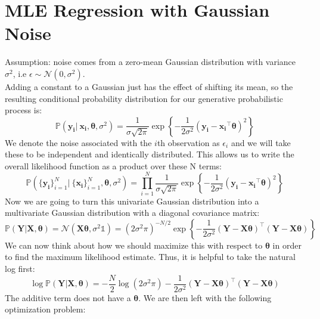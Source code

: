 \documentclass[twoside]{article}
\begin{document}
\section{MLE Regression with Gaussian Noise}
Assumption: noise comes from a zero-mean Gaussian distribution with variance $\sigma^2$, i.e $\epsilon \sim \mathcal{N}(0, \sigma^2)$.\\
Adding a constant to a Gaussian just has the effect of shifting its mean, so the resulting conditional
probability distribution for our generative probabilistic process is:
\begin{equation*}
    \mathbb{P}(\boldsymbol{y_i} | \: \boldsymbol{x_i}, \boldsymbol{\theta}, \sigma^2) = \frac{1}{\sigma\sqrt{2\pi}}\exp{\left \{-\frac{1}{2\sigma^2}(\boldsymbol{y_i} - \boldsymbol{x_i}^{\intercal}\boldsymbol{\theta})^2\right\}}
\end{equation*}
We denote the noise associated with the $i$th observation as $\epsilon_i$ and we will take these to be independent and identically distributed. This allows us to write the overall likelihood function as a product over these N terms:
\begin{equation*}
    \mathbb{P}(\{\boldsymbol{y_i}\}_{i = 1}^N | \: \{\boldsymbol{x_i}\}_{i = 1}^N, \boldsymbol{\theta}, \sigma^2) = \prod\limits_{i = 1}^N\frac{1}{\sigma\sqrt{2\pi}}\exp{\left \{-\frac{1}{2\sigma^2}(\boldsymbol{y_i} - \boldsymbol{x_i}^{\intercal}\boldsymbol{\theta})^2\right\}}
\end{equation*}
Now we are going to turn this univariate Gaussian distribution into a multivariate Gaussian distribution with a diagonal covariance matrix:
\begin{equation*}
    \mathbb{P}(\boldsymbol{Y}|\boldsymbol{X},\boldsymbol{\theta}) = \mathcal{N}(\boldsymbol{X}\boldsymbol{\theta}, \sigma^2\mathds{1}) = (2\sigma^2\pi)^{-N / 2}\exp{\left\{ -\frac{1}{2\sigma^2}(\boldsymbol{Y} - \boldsymbol{X\theta})^{\intercal}(\boldsymbol{Y} - \boldsymbol{X\theta}) \right\}}
\end{equation*}
We can now think about how we should maximize this with respect to $\boldsymbol{\theta}$ in order to find the maximum
likelihood estimate. Thus, it is helpful to take the natural log first:
\begin{equation*}
    \log\mathbb{P}(\boldsymbol{Y}|\boldsymbol{X},\boldsymbol{\theta}) = -\frac{N}{2}\log(2\sigma^2\pi) -\frac{1}{2\sigma^2}(\boldsymbol{Y} - \boldsymbol{X\theta})^{\intercal}(\boldsymbol{Y} - \boldsymbol{X\theta})
\end{equation*}
The additive term does not have a $\boldsymbol{\theta}$. We are then left with the following optimization problem:
\end{document}

